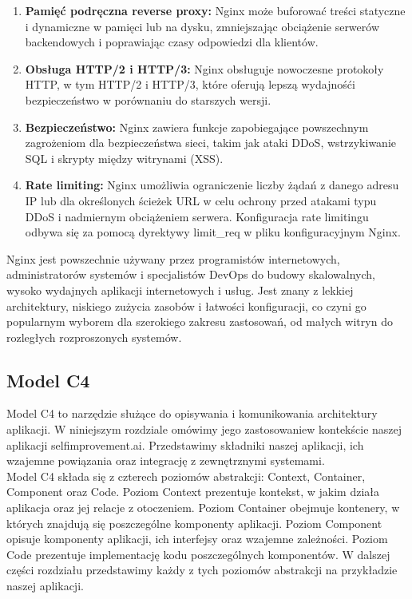 \begin{enumerate}
\item {\bf Pamięć podręczna reverse proxy:}
Nginx może buforować treści statyczne i dynamiczne w pamięci lub na dysku, zmniejszając obciążenie serwerów backendowych i poprawiając czasy odpowiedzi dla klientów.

\item {\bf Obsługa HTTP/2 i HTTP/3:}
Nginx obsługuje nowoczesne protokoły HTTP, w tym HTTP/2 i HTTP/3, które oferują lepszą wydajność\linebreak i bezpieczeństwo w porównaniu do starszych wersji.

\item {\bf Bezpieczeństwo:}
Nginx zawiera funkcje zapobiegające powszechnym zagrożeniom dla bezpieczeństwa sieci, takim jak ataki DDoS, wstrzykiwanie SQL i skrypty między witrynami (XSS).

\item {\bf Rate limiting:}
Nginx umożliwia ograniczenie liczby żądań z danego adresu IP lub dla określonych ścieżek URL w celu ochrony przed atakami typu DDoS i nadmiernym obciążeniem serwera. Konfiguracja rate limitingu odbywa się za pomocą dyrektywy limit\_req w pliku konfiguracyjnym Nginx.

\end{enumerate}

Nginx jest powszechnie używany przez programistów internetowych, administratorów systemów i specjalistów DevOps do budowy skalowalnych, wysoko wydajnych aplikacji internetowych i usług. Jest znany z lekkiej architektury, niskiego zużycia zasobów i łatwości konfiguracji, co czyni go popularnym wyborem dla szerokiego zakresu zastosowań, od małych witryn do rozległych rozproszonych systemów.

\subsection{Model C4}
Model C4 to narzędzie służące do opisywania i komunikowania architektury aplikacji. W niniejszym rozdziale omówimy jego zastosowanie\linebreak w kontekście naszej aplikacji selfimprovement.ai. Przedstawimy składniki naszej aplikacji, ich wzajemne powiązania oraz integrację z zewnętrznymi systemami.\\

Model C4 składa się z czterech poziomów abstrakcji: Context, Container, Component oraz Code. Poziom Context prezentuje kontekst, w jakim działa aplikacja oraz jej relacje z otoczeniem. Poziom Container obejmuje kontenery, w których znajdują się poszczególne komponenty aplikacji. Poziom Component opisuje komponenty aplikacji, ich interfejsy oraz wzajemne zależności. Poziom Code prezentuje implementację kodu poszczególnych komponentów. W dalszej części rozdziału przedstawimy każdy z tych poziomów abstrakcji na przykładzie naszej aplikacji.

